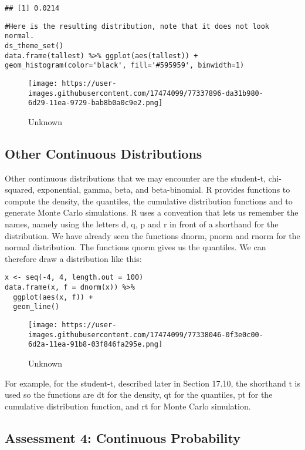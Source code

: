 \documentclass[
]{article}
\begin{document}
\begin{verbatim}
## [1] 0.0214
\end{verbatim}

\begin{verbatim}
#Here is the resulting distribution, note that it does not look normal.
ds_theme_set()
data.frame(tallest) %>% ggplot(aes(tallest)) + geom_histogram(color='black', fill='#595959', binwidth=1)
\end{verbatim}

\begin{figure}
\centering
\texttt{[image: https://user-images.githubusercontent.com/17474099/77337896-da31b980-6d29-11ea-9729-bab8b0a0c9e2.png]}
\caption{Unknown}
\end{figure}

\hypertarget{other-continuous-distributions}{%
\subsection{Other Continuous
Distributions}\label{other-continuous-distributions}}

Other continuous distributions that we may encounter are the student-t,
chi-squared, exponential, gamma, beta, and beta-binomial. R provides
functions to compute the density, the quantiles, the cumulative
distribution functions and to generate Monte Carlo simulations. R uses a
convention that lets us remember the names, namely using the letters d,
q, p and r in front of a shorthand for the distribution. We have already
seen the functions dnorm, pnorm and rnorm for the normal distribution.
The functions qnorm gives us the quantiles. We can therefore draw a
distribution like this:

\begin{verbatim}
x <- seq(-4, 4, length.out = 100)
data.frame(x, f = dnorm(x)) %>% 
  ggplot(aes(x, f)) + 
  geom_line()
\end{verbatim}

\begin{figure}
\centering
\texttt{[image: https://user-images.githubusercontent.com/17474099/77338046-0f3e0c00-6d2a-11ea-91b8-03f846fa295e.png]}
\caption{Unknown}
\end{figure}

For example, for the student-t, described later in Section 17.10, the
shorthand t is used so the functions are dt for the density, qt for the
quantiles, pt for the cumulative distribution function, and rt for Monte
Carlo simulation.

\hypertarget{assessment-4-continuous-probability}{%
\subsection{Assessment 4: Continuous
Probability}\label{assessment-4-continuous-probability}}
\end{document}
